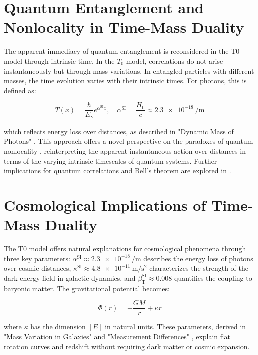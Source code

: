 \documentclass[a4paper,12pt]{article}
\newcommand{\Tfield}{T(x)}
\newcommand{\betaT}{\beta_{\text{T}}}
\begin{document}
	\section{Quantum Entanglement and Nonlocality in Time-Mass Duality}
	
	The apparent immediacy of quantum entanglement is reconsidered in the T0 model through intrinsic time. In the $T_0$ model, correlations do not arise instantaneously but through mass variations. In entangled particles with different masses, the time evolution varies with their intrinsic times. For photons, this is defined as:
	
	\begin{equation}
		\Tfield = \frac{\hbar}{E_{\gamma}} e^{\alpha^{\text{SI}} x}, \quad \alpha^{\text{SI}} = \frac{H_0}{c} \approx \SI{2,3e-18}{\per\meter}
	\end{equation}
	
	which reflects energy loss over distances, as described in "Dynamic Mass of Photons" \cite{pascher_photons_2025}. This approach offers a novel perspective on the paradoxes of quantum nonlocality \cite{bell1964}, reinterpreting the apparent instantaneous action over distances in terms of the varying intrinsic timescales of quantum systems. Further implications for quantum correlations and Bell's theorem are explored in \cite{pascher_feldtheorie_2025}.
	
	\section{Cosmological Implications of Time-Mass Duality}
	
	The T0 model offers natural explanations for cosmological phenomena through three key parameters: $\alpha^{\text{SI}} \approx \SI{2,3e-18}{\per\meter}$ describes the energy loss of photons over cosmic distances, $\kappa^{\text{SI}} \approx \SI{4,8e-11}{\meter\per\second\squared}$ characterizes the strength of the dark energy field in galactic dynamics, and $\betaT^{\text{SI}} \approx 0.008$ quantifies the coupling to baryonic matter. The gravitational potential becomes:
	
	\begin{equation}
		\Phi(r) = -\frac{G M}{r} + \kappa r
	\end{equation}
	
	where $\kappa$ has the dimension $[E]$ in natural units. These parameters, derived in "Mass Variation in Galaxies" \cite{pascher_galaxies_2025} and "Measurement Differences" \cite{pascher_messdifferenzen_2025}, explain flat rotation curves and redshift without requiring dark matter or cosmic expansion.
	
\end{document}
